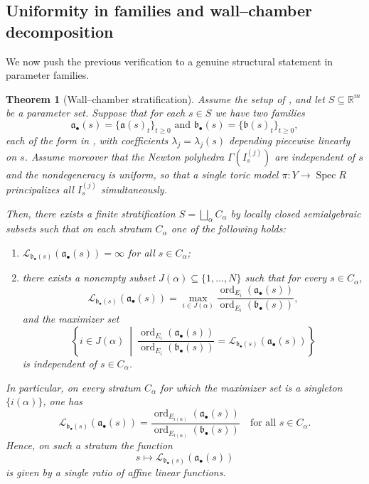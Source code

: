 \documentclass[12pt]{amsart}
\newcommand{\RR}{\mathbb{R}}
\newcommand{\ord}{\operatorname{\mathrm{ord}}}
\renewcommand{\a}{\mathfrak{a}}
\renewcommand{\b}{\mathfrak{b}}
\newcommand{\Loj}{\mathcal{L}} %
\DeclareMathOperator{\Spec}{Spec}
\newcommand{\abul}{{\a_\bullet}}
\newcommand{\bbul}{{\b_\bullet}}
\theoremstyle{plain}
\newtheorem{theorem}{Theorem}[section]
\theoremstyle{definition}
\numberwithin{equation}{section}
\begin{document}
\subsection{Uniformity in families and wall--chamber decomposition}\label{subsec:wall-chamber}

We now push the previous verification to a genuine structural statement in parameter families.

\begin{theorem}[Wall--chamber stratification]\label{thm:wall-chamber}
	Assume the setup of , and let $S \subseteq \RR^m$ be
	a parameter set.  Suppose that for each $s\in S$ we have two families
	\[
	\abul(s)=\{\a(s)_t\}_{t\ge0}
	\text{ and }
	\bbul(s)=\{\b(s)_t\}_{t\ge0},
	\]
	each of the form in , with coefficients
	$\lambda_j=\lambda_j(s)$ depending \emph{piecewise linearly} on $s$.
	Assume moreover that the Newton polyhedra $\Gamma(I^{(j)}_s)$ are independent of $s$ and the
	nondegeneracy is uniform, so that a single toric model $\pi:Y\to\Spec R$ principalizes all
	$I^{(j)}_s$ simultaneously.
	
	Then, there exists a finite stratification $S=\bigsqcup_{\alpha} C_\alpha$
	by locally closed semialgebraic subsets such that on each stratum $C_\alpha$ one of the following holds:
	\begin{enumerate}
		\item[(i)] $\Loj_{\bbul(s)}(\abul(s))=\infty$ for all $s\in C_\alpha$;
		\item[(ii)] there exists a nonempty subset $J(\alpha)\subseteq \{1,\dots,N\}$
		such that for every $s\in C_\alpha$,
		\[
		\Loj_{\bbul(s)}(\abul(s))
		=
		\max_{i\in J(\alpha)}
		\frac{\ord_{E_i}(\abul(s))}{\ord_{E_i}(\bbul(s))},
		\]
		and the maximizer set
		\[
		\left\{
		i\in J(\alpha)\ \middle|\
		\frac{\ord_{E_i}(\abul(s))}{\ord_{E_i}(\bbul(s))}
		=
		\Loj_{\bbul(s)}(\abul(s))
		\right\}
		\]
		is independent of $s\in C_\alpha$.
	\end{enumerate}
	In particular, on every stratum $C_\alpha$ for which the maximizer set is a singleton
	$\{i(\alpha)\}$, one has
	\[
	\Loj_{\bbul(s)}(\abul(s))
	=
	\frac{\ord_{E_{i(\alpha)}}(\abul(s))}{\ord_{E_{i(\alpha)}}(\bbul(s))}
	\quad\text{for all } s\in C_\alpha.
	\]
	Hence, on such a stratum the function
	\[
	s\longmapsto \Loj_{\bbul(s)}(\abul(s))
	\]
	is given by a single ratio of affine linear functions.
\end{theorem}
\end{document}
